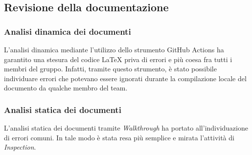 \subsection{Revisione della documentazione}

\subsubsection{Analisi dinamica dei documenti}
L'analisi dinamica mediante l'utilizzo dello strumento GitHub Actions ha garantito una stesura del codice \LaTeX{} priva di errori e più coesa fra tutti i membri del gruppo. Infatti, tramite questo strumento, è stato possibile individuare errori che potevano essere ignorati durante la compilazione locale del documento da qualche membro del team.

\subsubsection{Analisi statica dei documenti}
L'analisi statica dei documenti tramite \textit{Walkthrough} ha portato all'individuazione di errori comuni. In tale modo è stata resa più semplice e mirata l'attività di \textit{Inspection}.

